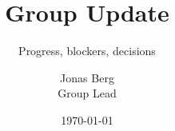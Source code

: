 \documentclass[aspectratio=169,11pt]{beamer}
\title{Group Update}
\subtitle{Progress, blockers, decisions}
\author{Jonas Berg \\ \small Group Lead}
\date{\today}
\begin{document}
\titleslide






\end{document}
